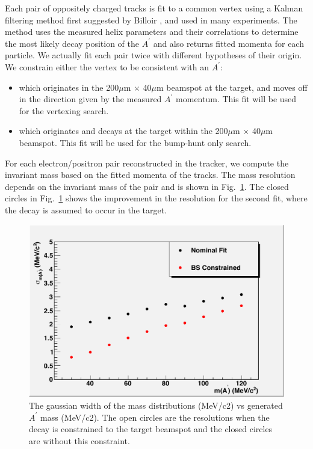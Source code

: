 Each pair of oppositely charged tracks is fit to a common vertex using a Kalman filtering 
method first suggested by Billoir \cite{bf}, \cite{bq} and used in many experiments.  The method 
uses the measured helix parameters and their correlations to determine the most likely 
decay position of the $A^\prime$ and also returns fitted momenta for each particle.  We actually 
fit each pair twice with different hypotheses of their origin.  We constrain either 
the vertex to be consistent with an $A^\prime$:

\begin{itemize}
\item which originates in the 200$\mu$m $\times$ 40$\mu$m beamspot at the target, and moves off 
in the direction given by the measured $A^\prime$ momentum.  This fit will be used for the vertexing search.  
\item which originates and decays at the target within the 200$\mu$m $\times$ 40$\mu$m beamspot.  
This fit will be used for the bump-hunt only search.  
\end{itemize}

For each electron/positron pair reconstructed in the tracker, we compute the invariant mass based 
on the fitted momenta of the tracks.  The mass resolution depends on the invariant mass of the pair 
and is shown in Fig.~\ref{fig:massres}.  The closed circles  in Fig.~\ref{fig:massres} shows the improvement 
in the resolution for the second fit, where the decay is assumed to occur in the target.  

\begin{figure}
\includegraphics[scale=0.8]{performance/tracking_performance/massRes-2pt2.pdf}
\caption{The gaussian width of the mass distributions (MeV/c2) vs generated $A^\prime$ mass (MeV/c2). 
 The open circles are the resolutions when the decay is constrained to the target beamspot 
and the closed circles are without this constraint.    }
\label{fig:massres}
\end{figure}



